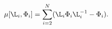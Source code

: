 \begin{equation}\label{mom_map}
  \mu[\L_i,\Phi_i]=\sum_{i=2}^N(\L_i\Phi_i\L_i^{-1}-\Phi_i).
\end{equation}

